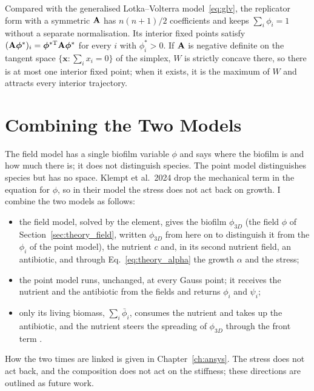 Compared with the generalised Lotka--Volterra model~\eqref{eq:glv}, the
replicator form with a symmetric $\mathbf{A}$ has $n(n+1)/2$ coefficients and keeps
$\sum_i\phi_i=1$ without a separate normalisation. Its interior fixed points
satisfy $(\mathbf{A}\boldsymbol{\phi}^*)_i=\boldsymbol{\phi}^{*\rm T}\mathbf{A}\boldsymbol{\phi}^*$ for every $i$ with
$\phi^*_i>0$. If $\mathbf{A}$ is negative definite on the tangent space
$\{\mathbf x:\sum_i x_i=0\}$ of the simplex, $W$ is strictly concave there,
so there is at most one interior fixed point; when it exists, it is the
maximum of $W$ and attracts every interior trajectory.

\section{Combining the Two Models}
\label{sec:theory_link}

The field model has a single biofilm variable $\phi$ and says where the
biofilm is and how much there is; it does not distinguish species. The point
model distinguishes species but has no space. Klempt et al.\ 2024 drop the
mechanical term in the equation for $\phi$, so in their model the stress does
not act back on growth. I combine the two models as follows:
\begin{itemize}
  \item the field model, solved by the element, gives the biofilm $\phi_{3D}$
        (the field $\phi$ of Section~\ref{sec:theory_field}, written $\phi_{3D}$ from
        here on to distinguish it from the $\phi_i$ of the point model),
        the nutrient $c$ and, in its second nutrient field, an antibiotic, and
        through Eq.~\eqref{eq:theory_alpha} the growth $\alpha$ and the stress;
  \item the point model runs, unchanged, at every Gauss point; it receives the
        nutrient and the antibiotic from the fields and returns $\phi_i$ and
        $\psi_i$;
  \item only its living biomass, $\sum_i\bar\phi_i$, consumes the nutrient and
        takes up the antibiotic, and the nutrient steers the spreading of
        $\phi_{3D}$ through the front term \fterm{}.
\end{itemize}
How the two times are linked is given in Chapter~\ref{ch:ansys}. The stress does
not act back, and the composition does not act on the stiffness; these
directions are outlined as future work.

